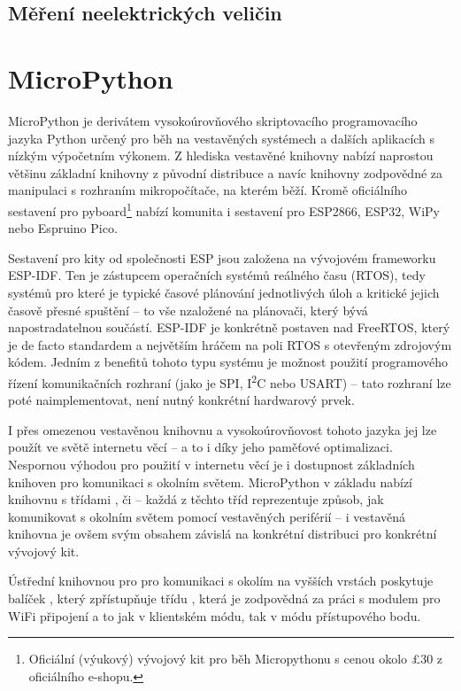 \subsection{Měření neelektrických veličin}

\section{MicroPython}\label{sec:micropython}
MicroPython je derivátem vysokoúrovňového skriptovacího programovacího jazyka Python určený pro běh na vestavěných systémech a dalších
aplikacích s nízkým výpočetním výkonem.
Z hlediska vestavěné knihovny nabízí naprostou většinu základní knihovny z původní distribuce a navíc knihovny
zodpovědné za manipulaci s rozhraním mikropočítače, na kterém běží.
Kromě oficiálního sestavení pro pyboard\footnote{Oficiální (výukový) vývojový kit pro běh Micropythonu s
cenou okolo \pounds30 z oficiálního e-shopu.} nabízí komunita i sestavení pro ESP2866, ESP32, WiPy nebo Espruino Pico.

Sestavení pro kity od společnosti ESP jsou založena na vývojovém frameworku ESP-IDF.
Ten je zástupcem operačních systémů reálného času (RTOS), tedy systémů pro které je typické časové plánování jednotlivých úloh
a kritické jejich časově přesné spuštění -- to vše nzaložené na plánovači, který bývá napostradatelnou součástí.
ESP-IDF je konkrétně postaven nad FreeRTOS, který je de facto standardem a největším hráčem na poli RTOS s otevřeným
zdrojovým kódem. 
Jedním z benefitů tohoto typu systému je možnost použití programového řízení komunikačních rozhraní
(jako je SPI, I\textsuperscript{2}C nebo USART) -- tato rozhraní lze poté naimplementovat, není nutný konkrétní hardwarový prvek.

I přes omezenou vestavěnou knihovnu a vysokoúrovňovost tohoto jazyka jej lze použít ve světě internetu věcí --
a to i díky jeho paměťové optimalizaci.
Nespornou výhodou pro použití v internetu věcí je i dostupnost základních knihoven pro komunikaci s okolním světem.
MicroPython v základu nabízí knihovnu  s třídami ,  či  --
každá z těchto tříd reprezentuje způsob, jak komunikovat s okolním světem pomocí vestavěných periférií
-- i vestavěná knihovna je ovšem svým obsahem závislá na konkrétní distribuci pro konkrétní vývojový kit.

Ústřední knihovnou pro pro komunikaci s okolím na vyšších vrstách poskytuje balíček , který zpřístupňuje
třídu , která je zodpovědná za práci s modulem pro WiFi připojení a to jak v klientském módu, tak v módu
přístupového bodu.

